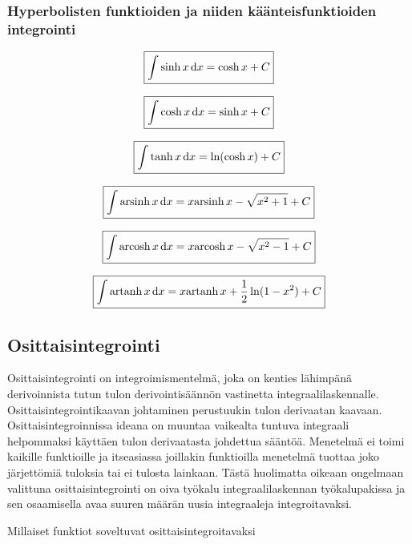 \documentclass[../integrointiopas.tex]{subfiles}
\begin{document}
	\subsubsection{Hyperbolisten funktioiden ja niiden käänteisfunktioiden integrointi}
	
	\begin{equation}
		\boxed{\int \sinh x\odif{x} = \cosh x + C}
	\end{equation}

	\begin{equation}
		\boxed{\int \cosh x\odif{x} = \sinh x + C}
	\end{equation}

	\begin{equation}
		\boxed{\int \tanh x\odif{x} = \ln(\cosh x) + C}
	\end{equation}

	\begin{equation}
		\boxed{\int \arsinh x\odif{x} = x\arsinh x - \sqrt{x^2 + 1} + C}
	\end{equation}

	\begin{equation}
		\boxed{\int \arcosh x\odif{x} = x\arcosh x - \sqrt{x^2 - 1} + C}
	\end{equation}

	\begin{equation}
		\boxed{\int \artanh x\odif{x} = x\artanh x + \frac{1}{2}\ln(1 - x^2) + C}
	\end{equation}

	\subsection{Osittaisintegrointi}
	
	Osittaisintegrointi on integroimismentelmä, joka on kenties lähimpänä derivoinnista tutun tulon derivointisäännön vastinetta integraalilaskennalle. Osittaisintegrointikaavan johtaminen perustuukin tulon derivaatan kaavaan. Osittaisintegroinnissa ideana on muuntaa vaikealta tuntuva integraali helpommaksi käyttäen tulon derivaatasta johdettua sääntöä. Menetelmä ei toimi kaikille funktioille ja itseasiassa joillakin funktioilla menetelmä tuottaa joko järjettömiä tuloksia tai ei tulosta lainkaan. Tästä huolimatta oikeaan ongelmaan valittuna osittaisintegrointi on oiva työkalu integraalilaskennan työkalupakissa ja sen osaamisella avaa suuren määrän uusia integraaleja integroitavaksi.
	
	Millaiset funktiot soveltuvat osittaisintegroitavaksi
	
\end{document}
